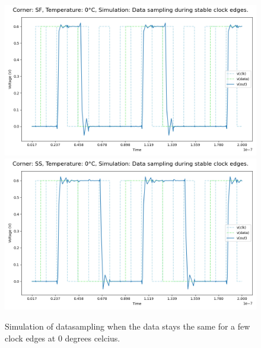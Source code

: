 \begin{figure}[H]
    \vspace{5pt}
    \includegraphics[height= 0.21\textheight]{figures/aimspice/SF/0/W3.csv.png}
    \vspace{5pt}
    \includegraphics[height= 0.21\textheight]{figures/aimspice/SS/0/W3.csv.png}
    \caption{Simulation of datasampling when the data stays the same for a few clock edges at 0 degrees celcius.}
    \label{fig:aimspice_W3_0}
\end{figure}

\pagebreak

